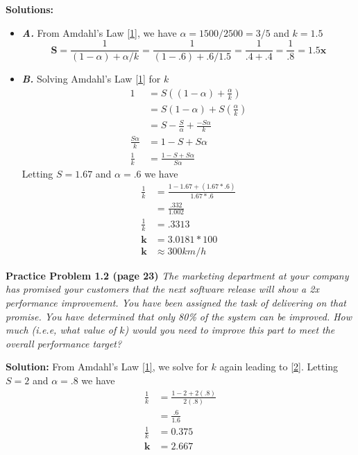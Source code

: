 \documentclass[a4paper]{report}
\begin{document}
\textbf{Solutions:}
\begin{itemize}
\item \textbf{\textit{A. }} From Amdahl's Law \eqref{1}, we have \(\alpha = 1500/2500 = 3/5 \) and \(k = 1.5 \)
	\begin{equation} 
		\bm{S} 
			= \frac{1}{(1 - \alpha) + \alpha/k}
			= \frac{1}{(1 - .6) + .6/1.5}
			= \frac{1}{.4 + .4}
			= \frac{1}{.8}
			= \boxed{1.5\bm{x}}
	\end{equation}
\item \textbf{\textit{B. }} Solving Amdahl's Law \eqref{1} for $k$ 
	\begin{equation}
	\begin{split}
		1 &= S((1 - \alpha) + \frac{\alpha}{k}) \\
		  &= S(1 - \alpha) + S(\frac{\alpha}{k}) \\
		  &= S - \frac{S}{\alpha} + \frac{-S\alpha}{k} \\
		\frac{S\alpha}{k} &= 1 - S + S\alpha \\
		\frac{1}{k} &= \frac{1 - S + S\alpha}{S\alpha} \label{2}	
	\end{split}
	\end{equation}
Letting \(S = 1.67 \) and \(\alpha = .6 \) we have
	\begin{equation}
	\begin{split}
		\frac{1}{k} &= \frac{1 - 1.67 + (1.67 * .6)}{1.67 * .6} \\
		            &= \frac{.332}{1.002} \\
		\frac{1}{k} &= .3313 \\
		     \bm{k} &= 3.0181 * 100 \\
		     \bm{k} &\approx  300 km/h
	\end{split}
	\end{equation}
\end{itemize}

\textbf{Practice Problem 1.2 (page 23)} \textit{The marketing department at your company has promised your customers that the next software release will show a 2x performance improvement. You have been assigned the task of delivering on that promise. You have determined that only 80\% of the system can be improved. How much (i.e.e, what value of $k$) would you need to improve this part to meet the overall performance target?}

\textbf{Solution:}
From Amdahl's Law \eqref{1}, we solve for $k$ again leading to \eqref{2}. Letting \(S = 2 \) and \(\alpha = .8\) we have
	\begin{equation}
	\begin{split}
		\frac{1}{k} &= \frac{1 - 2 + 2(.8)}{2(.8)} \\
		&= \frac{.6}{1.6} \\
		\frac{1}{k} &= 0.375 \\
		\bm{k} &= 2.667
	\end{split}
	\end{equation}
\end{document}
